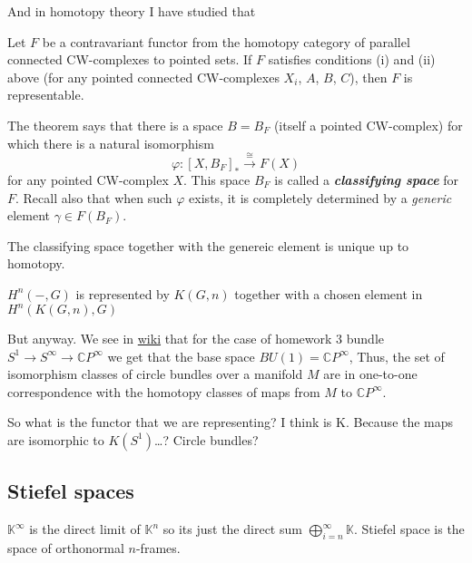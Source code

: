And in homotopy theory I have studied that

\begin{thm}
	Let $F$ be a contravariant functor from the homotopy category of parallel connected CW-complexes to pointed sets. If $F$ satisfies conditions (i) and (ii) above (for any pointed connected CW-complexes $X_{i}$, $A$, $B$, $C$), then $F$ is representable.
\end{thm}

\begin{remark}
	The theorem says that there is a space $B=B_{F}$ (itself a pointed CW-complex) for which there is a natural isomorphism
	\[\varphi :[X,B_{F}]_{*}\overset{\cong }{\longrightarrow}F(X)\]
	for any pointed CW-complex $X$. This space $B_{F}$ is called a \textit{\textbf{classifying space}} for $F$. Recall also that when such $\varphi$ exists, it is completely determined by a \textit{generic} element $\gamma\in F(B_{F})$.

	The classifying space together with the genereic element is unique up to homotopy.
\end{remark}

\begin{remark}
	$H^{n}(-,G)$ is represented by  $K(G,n)$ together with a chosen element in $H^{n}(K(G,n),G)$
\end{remark}

But anyway. We see in \href{https://en.wikipedia.org/wiki/Classifying_space_for_U(n)#Case_of_line_bundles}{wiki} that for the case of homework 3 bundle  $S^1\to S^\infty\to \mathbb{C}P^\infty$ we get that the base space $BU(1)=\mathbb{C}P^\infty$, Thus, the set of isomorphism classes of circle bundles over a manifold $M$ are in one-to-one correspondence with the homotopy classes of maps from $M$ to $\mathbb{C}P^\infty$.

So what is the functor that we are representing? I think is K. Because the maps are isomorphic to  $K(S^1)$…? Circle bundles?

\subsection{Stiefel spaces}

\begin{defn}
	$\mathbb{K}^\infty$ is the direct limit of $\mathbb{K}^n$ so its just the direct sum $\bigoplus_{i=n}^\infty\mathbb{K} $. Stiefel space is the space of orthonormal $n$-frames.
\end{defn}

